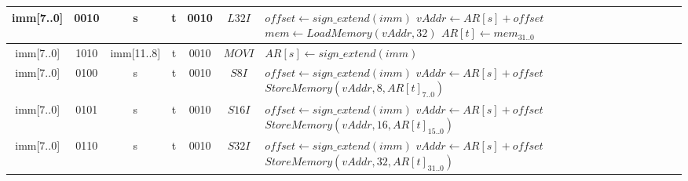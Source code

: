\begin{smalltables}
\begin{longtable}{llllllllllllllllllllllll  p{1cm}  p{7cm} | }
	   \multicolumn{8}{|c|}{imm[7..0]} & \multicolumn{4}{c|}{0010} & \multicolumn{4}{c|}{s} & \multicolumn{4}{c|}{t} & \multicolumn{4}{c|}{0010} & \multicolumn{1}{c|}{$L32I$} & $offset \leftarrow sign\_extend(imm)$ \newline $vAddr \leftarrow AR[s] + offset$ \newline $mem \leftarrow LoadMemory(vAddr, 32)$ \newline $AR[t] \leftarrow mem_{31..0}$\\ \hline
	   \multicolumn{8}{|c|}{imm[7..0]} & \multicolumn{4}{c|}{1010} & \multicolumn{4}{c|}{imm[11..8]} & \multicolumn{4}{c|}{t} & \multicolumn{4}{c|}{0010} & \multicolumn{1}{c|}{$MOVI$} & $AR[s] \leftarrow sign\_extend(imm)$ \\ \hline
       \multicolumn{8}{|c|}{imm[7..0]} & \multicolumn{4}{c|}{0100} & \multicolumn{4}{c|}{s} & \multicolumn{4}{c|}{t} & \multicolumn{4}{c|}{0010} & \multicolumn{1}{c|}{$S8I$} & $offset \leftarrow sign\_extend(imm)$ \newline $vAddr \leftarrow AR[s] + offset$ \newline $StoreMemory(vAddr, 8, AR[t]_{7..0})$\\ \hline
       \multicolumn{8}{|c|}{imm[7..0]} & \multicolumn{4}{c|}{0101} & \multicolumn{4}{c|}{s} & \multicolumn{4}{c|}{t} & \multicolumn{4}{c|}{0010} & \multicolumn{1}{c|}{$S16I$} & $offset \leftarrow sign\_extend(imm)$ \newline $vAddr \leftarrow AR[s] + offset$ \newline $StoreMemory(vAddr, 16, AR[t]_{15..0})$\\ \hline
       \multicolumn{8}{|c|}{imm[7..0]} & \multicolumn{4}{c|}{0110} & \multicolumn{4}{c|}{s} & \multicolumn{4}{c|}{t} & \multicolumn{4}{c|}{0010} & \multicolumn{1}{c|}{$S32I$} & $offset \leftarrow sign\_extend(imm)$ \newline $vAddr \leftarrow AR[s] + offset$ \newline $StoreMemory(vAddr, 32, AR[t]_{31..0})$\\ \hline
	\end{longtable}


\end{smalltables}
